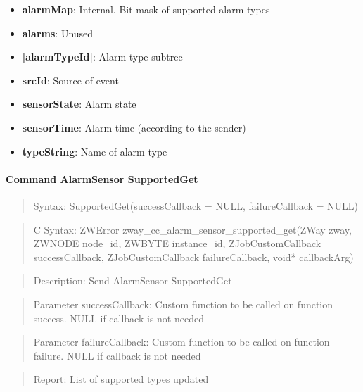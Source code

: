 \begin{itemize}
\item \textbf{alarmMap}: Internal. Bit mask of supported alarm types
\item \textbf{alarms}: Unused
\item \textbf{[alarmTypeId]}: Alarm type subtree
\item \qquad\textbf{srcId}: Source of event
\item \qquad\textbf{sensorState}: Alarm state
\item \qquad\textbf{sensorTime}: Alarm time (according to the sender)
\item \qquad\textbf{typeString}: Name of alarm type
\end{itemize}

\paragraph{Command AlarmSensor SupportedGet}
\begin{quote}Syntax: SupportedGet(successCallback = NULL, failureCallback = NULL)\end{quote}
\begin{quote}C Syntax: ZWError zway\_cc\_alarm\_sensor\_supported\_get(ZWay zway, ZWNODE node\_id, ZWBYTE instance\_id, ZJobCustomCallback successCallback, ZJobCustomCallback failureCallback, void* callbackArg)\end{quote}
\begin{quote}Description: Send AlarmSensor SupportedGet\end{quote}
\begin{quote}Parameter successCallback: Custom function to be called on function success. NULL if callback is not needed\end{quote}
\begin{quote}Parameter failureCallback: Custom function to be called on function failure. NULL if callback is not needed\end{quote}
\begin{quote}Report: List of supported types updated\end{quote}

